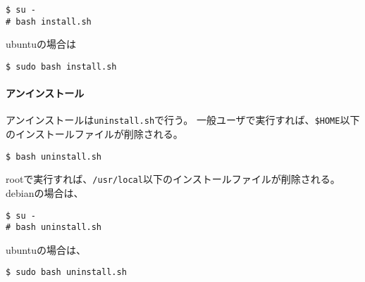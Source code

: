 \begin{verbatim}
$ su -
# bash install.sh
\end{verbatim}

ubuntuの場合は

\begin{verbatim}
$ sudo bash install.sh
\end{verbatim}

\hypertarget{ux30a2ux30f3ux30a4ux30f3ux30b9ux30c8ux30fcux30eb}{%
\paragraph{アンインストール}\label{ux30a2ux30f3ux30a4ux30f3ux30b9ux30c8ux30fcux30eb}}

アンインストールは\texttt{uninstall.sh}で行う。
一般ユーザで実行すれば、\texttt{\$HOME}以下のインストールファイルが削除される。

\begin{verbatim}
$ bash uninstall.sh
\end{verbatim}

rootで実行すれば、\texttt{/usr/local}以下のインストールファイルが削除される。
debianの場合は、

\begin{verbatim}
$ su -
# bash uninstall.sh
\end{verbatim}

ubuntuの場合は、

\begin{verbatim}
$ sudo bash uninstall.sh
\end{verbatim}
